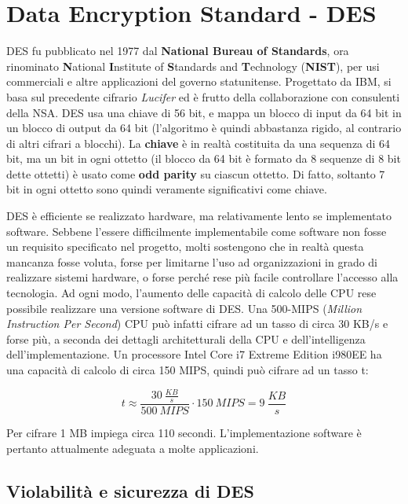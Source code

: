 \section{Data Encryption Standard - DES}
DES fu pubblicato nel 1977 dal \textbf{National Bureau of Standards}, ora rinominato \textbf{N}ational \textbf{I}nstitute of \textbf{S}tandards and \textbf{T}echnology (\textbf{NIST}), per usi commerciali e altre applicazioni del governo statunitense. Progettato da IBM, si basa sul precedente cifrario \textit{Lucifer} ed è frutto della collaborazione con consulenti della NSA. DES usa una chiave di 56 bit, e mappa un blocco di input da 64 bit in un blocco di output da 64 bit (l'algoritmo è quindi abbastanza rigido, al contrario di altri cifrari a blocchi). La \textbf{chiave} è in realtà costituita da una sequenza di 64 bit, ma un bit in ogni ottetto (il blocco da 64 bit è formato da 8 sequenze di 8 bit dette ottetti) è usato come \textbf{odd parity} su ciascun ottetto. Di fatto, soltanto 7 bit in ogni ottetto sono quindi veramente significativi come chiave. \newline

DES è efficiente se realizzato hardware, ma relativamente lento se implementato software. Sebbene l'essere difficilmente implementabile come software non fosse un requisito specificato nel progetto, molti sostengono che in realtà questa mancanza fosse voluta, forse per limitarne l'uso ad organizzazioni in grado di realizzare sistemi hardware, o forse perché rese più facile controllare l'accesso alla tecnologia. Ad ogni modo, l'aumento delle capacità di calcolo delle CPU rese possibile realizzare una versione software di DES. Una 500-MIPS (\textit{Million Instruction Per Second}) CPU può infatti cifrare ad un tasso di circa 30 KB/s e forse più, a seconda dei dettagli architetturali della CPU e dell'intelligenza dell'implementazione. Un processore Intel Core i7 Extreme Edition i980EE ha una capacità di calcolo di circa 150 MIPS, quindi può cifrare ad un tasso t:


\[
t \approx \frac{30 \: \frac{KB}{s}}{500 \: MIPS} \cdot 150 \: MIPS = 9 \: \frac{KB}{s}
\]

Per cifrare 1 MB impiega circa 110 secondi. L’implementazione software è pertanto attualmente adeguata a molte applicazioni.\newline \newline


\subsection{Violabilità e sicurezza di DES}

